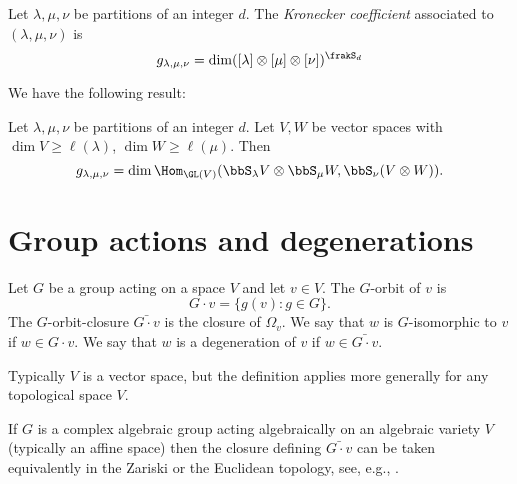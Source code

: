 \begin{definition}
 \label{introduction-definition-kroncoefficient}
 Let $\lambda,\mu,\nu$ be partitions of an integer $d$. The {\it Kronecker coefficient} associated to $(\lambda,\mu,\nu)$ is 
 \[
 g_{\lambda,\mu,\nu} = \dim ([\lambda] \otimes [\mu] \otimes [\nu])^{\frakS_d}
 \]
\end{definition}
We have the following result:
\begin{lemma}
 \label{introduction-lemma-kroncoefficientGL}
 Let $\lambda,\mu,\nu$ be partitions of an integer $d$. Let $V,W$ be vector spaces with $\dim V \geq \ell(\lambda)$, $\dim W \geq \ell(\mu)$. Then 
 \[
 g_{\lambda,\mu,\nu} = \dim \Hom_{\GL(V)} ( \bbS_\lambda V \otimes \bbS_\mu W , \bbS_\nu(V \otimes W)).
 \]
\end{lemma}


\section{Group actions and degenerations}
\label{introduction-section-groupactions}

\begin{definition}
\label{introduction-definition-orbitsdegenerations}
Let $G$ be a group acting on a space $V$ and let $v \in V$. The $G$-orbit of $v$ is 
\[
G\cdot v= \{ g(v) : g \in G \}.
\]
The $G$-orbit-closure $\bar{G\cdot v}$ is the closure of $\Omega_v$. We say that $w$ is $G$-isomorphic to $v$ if $w \in G\cdot v$. We say that $w$ is a degeneration of $v$ if $w \in \bar{G\cdot v}$.

Typically $V$ is a vector space, but the definition applies more generally for any topological space $V$.
\end{definition}

If $G$ is a complex algebraic group acting algebraically on an algebraic variety $V$ (typically an affine space) then the closure defining $\bar{G\cdot v}$ can be taken equivalently in the Zariski or the Euclidean topology, see, e.g., \cite[Thm. 2.33]{Mum76}.

